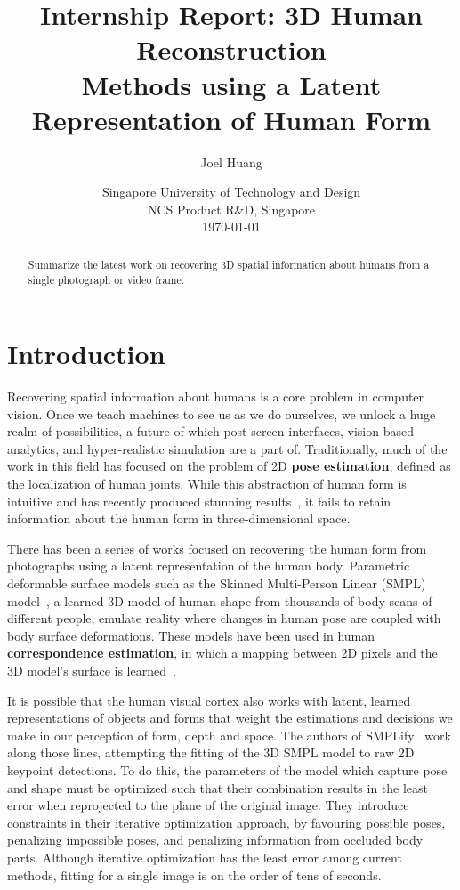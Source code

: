 \documentclass[9pt,twocolumn]{article}
\title{
	Internship Report: 3D Human Reconstruction\\
	Methods using a Latent Representation of Human Form
}
\author{Joel Huang}
\date{
    Singapore University of Technology and Design \\
    NCS Product R\&D, Singapore \\[2ex]
	\today
}
\begin{document}
\maketitle

\begin{abstract}
	Summarize the latest work on recovering 3D spatial information about humans
	from a single photograph or video frame. %
\end{abstract}

\section{Introduction}

	\par{Recovering spatial information about humans is a core problem in computer vision.
	Once we teach machines to see us as we do ourselves, we unlock a huge realm of
	possibilities, a future of which post-screen interfaces, vision-based analytics,
	and hyper-realistic simulation are a part of. Traditionally, much of the work
	in this field has focused on the problem of 2D \textbf{pose estimation}, defined as the
	localization of human joints. While this abstraction of human form is intuitive
	and has recently produced stunning results~\cite{openpose-paf}, it fails to retain
	information	about the human form in three-dimensional space.}

	\par{There has been a series of works focused on recovering the human form from
	photographs using a latent representation of the human body. Parametric	deformable
	surface models such as the Skinned Multi-Person Linear (SMPL) model~\cite{smpl},
	a learned 3D model of human shape from thousands of body scans of different people,
	emulate reality where changes in human pose are coupled with body surface deformations.
	These models have been used in human \textbf{correspondence estimation}, in which
	a mapping between 2D pixels and the 3D model's surface is learned~\cite{densereg,densepose}.}
	
	\par{It is possible that the human visual cortex also works with latent, learned representations
	of objects and forms that weight the estimations and decisions we make in our perception of
	form, depth and space. The authors of SMPLify~\cite{smplify} work along those lines, attempting
	the fitting of the 3D SMPL model to raw 2D keypoint detections. To do this, the parameters of
	the model which capture pose and shape must be optimized such that their combination results in
	the least error when reprojected to the plane of the original image. They introduce constraints in
	their iterative optimization approach, by favouring possible poses, penalizing impossible poses,
	and penalizing information from occluded body parts. Although iterative optimization has the
	least error among current methods, fitting for a single image is on the order of tens of
	seconds.}
\end{document}
